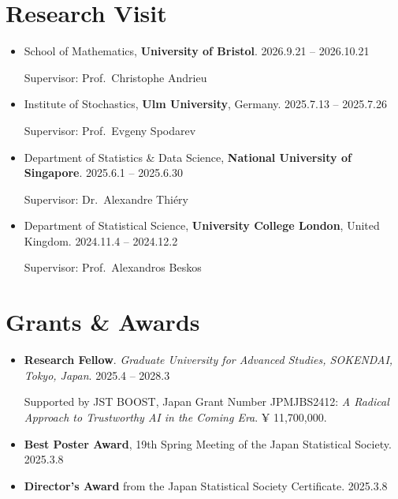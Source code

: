 \documentclass[
  11pt,
]{article}
\renewcommand{\labelitemi}{\textcolor{minty}{\faCheckCircle}} %
\begin{document}
\section{Research Visit}\label{research-visit}

\renewcommand{\labelitemi}{\textcolor{minty}{\faUniversity}}

\begin{itemize}
\item
  School of Mathematics, \textbf{University of Bristol}.
  \hfill {2026.9.21 -- 2026.10.21}

  Supervisor: Prof.~Christophe Andrieu
\item
  Institute of Stochastics, \textbf{Ulm University}, Germany.
  \hfill {2025.7.13 -- 2025.7.26}

  Supervisor: Prof.~Evgeny Spodarev
\item
  Department of Statistics \& Data Science, \textbf{National University
  of Singapore}. \hfill {2025.6.1 -- 2025.6.30}

  Supervisor: Dr.~Alexandre Thiéry
\item
  Department of Statistical Science, \textbf{University College London},
  United Kingdom. \hfill {2024.11.4 -- 2024.12.2}

  Supervisor: Prof.~Alexandros Beskos
\end{itemize}

\section{Grants \& Awards}\label{grants-awards}

\renewcommand{\labelitemi}{\textcolor{minty}{\faAward}}

\begin{itemize}
\item
  \textbf{Research Fellow}. \emph{Graduate University for Advanced
  Studies, SOKENDAI, Tokyo, Japan}. \hfill {2025.4 -- 2028.3}

  Supported by JST BOOST, Japan Grant Number JPMJBS2412: \emph{A Radical
  Approach to Trustworthy AI in the Coming Era}. ¥ 11,700,000.
\item
  \textbf{Best Poster Award}, 19th Spring Meeting of the Japan
  Statistical Society. \hfill {2025.3.8}
\item
  \textbf{Director's Award} from the Japan Statistical Society
  Certificate. \hfill {2025.3.8}
\end{itemize}

\renewcommand{\labelitemi}{\textcolor{minty}{\faBookmark}}
\end{document}
